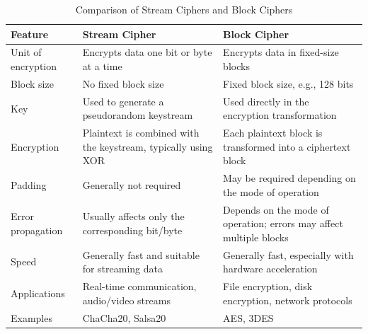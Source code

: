 \documentclass[a4paper, 12pt]{book} %
\begin{document}
\begin{table}[ht]
    \centering
    \caption{Comparison of Stream Ciphers and Block Ciphers}
    \label{tab:stream-vs-block}
    \begin{tabular}{p{} p{} p{}}
        \hline
        \textbf{Feature} & \textbf{Stream Cipher} & \textbf{Block Cipher} \\
        \hline
        
        Unit of encryption
        & Encrypts data one bit or byte at a time
        & Encrypts data in fixed-size blocks \\[0.5em]
        
        Block size
        & No fixed block size
        & Fixed block size, e.g., 128 bits \\[0.5em]
        
        Key
        & Used to generate a pseudorandom keystream
        & Used directly in the encryption transformation \\[0.5em]
        
        Encryption
        & Plaintext is combined with the keystream, typically using XOR
        & Each plaintext block is transformed into a ciphertext block \\[0.5em]
        
        Padding
        & Generally not required
        & May be required depending on the mode of operation \\[0.5em]
        
        Error propagation
        & Usually affects only the corresponding bit/byte
        & Depends on the mode of operation; errors may affect multiple blocks \\[0.5em]
        
        Speed
        & Generally fast and suitable for streaming data
        & Generally fast, especially with hardware acceleration \\[0.5em]
        
        Applications
        & Real-time communication, audio/video streams
        & File encryption, disk encryption, network protocols \\[0.5em]
        
        Examples
        & ChaCha20, Salsa20
        & AES, 3DES \\[0.5em]
        
        \hline
    \end{tabular}
\end{table}
\end{document}
